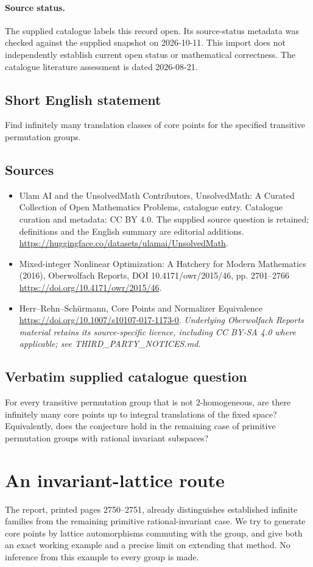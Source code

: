 \documentclass[11pt]{article}
\begin{document}
\paragraph{Source status.}
The supplied catalogue labels this record open. Its source-status metadata was checked against the supplied snapshot on 2026-10-11. This import does not independently establish current open status or mathematical correctness. The catalogue literature assessment is dated 2026-08-21.
\subsection{Short English statement}
Find infinitely many translation classes of core points for the specified transitive permutation groups.
\subsection{Sources}
\begin{itemize}
\item[S1] Ulam AI and the UnsolvedMath Contributors, UnsolvedMath: A Curated Collection of Open Mathematics Problems, catalogue entry. Catalogue curation and metadata: CC BY 4.0. The supplied source question is retained; definitions and the English summary are editorial additions.
\url{https://huggingface.co/datasets/ulamai/UnsolvedMath}.
\item[S2] Mixed-integer Nonlinear Optimization: A Hatchery for Modern Mathematics (2016), Oberwolfach Reports, DOI 10.4171/owr/2015/46, pp. 2701--2766
\url{https://doi.org/10.4171/owr/2015/46}.
\item[S3] Herr--Rehn--Schürmann, Core Points and Normalizer Equivalence
\url{https://doi.org/10.1007/s10107-017-1173-0}.
\textit{Underlying Oberwolfach Reports material retains its source-specific licence, including CC BY-SA 4.0 where applicable; see THIRD\_PARTY\_NOTICES.md.}
\end{itemize}
\subsection{Verbatim supplied catalogue question}
For every transitive permutation group that is not $2$-homogeneous, are there infinitely many core points up to integral translations of the fixed space? Equivalently, does the conjecture hold in the remaining case of primitive permutation groups with rational invariant subspaces?

\section{An invariant-lattice route}
The report, printed pages 2750--2751, already distinguishes established
infinite families from the remaining primitive rational-invariant case.
We try to generate core points by lattice automorphisms commuting with the
group, and give both an exact working example and a precise limit on extending
that method. No inference from this example to every group is made.
\end{document}
